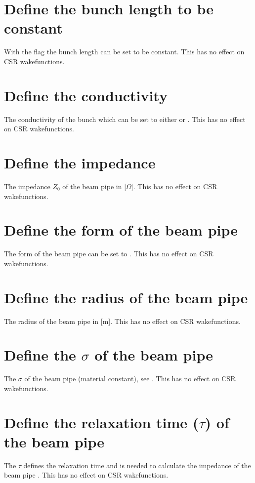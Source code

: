\section{Define the bunch length to be constant}
\label{sec:CONSTLEN}
With the  flag the bunch length can be set to be constant. This has no effect on CSR wakefunctions.

\section{Define the conductivity}
\label{sec:CONDUCT}
The conductivity of the bunch which can be set to either  or . This has no effect on CSR wakefunctions.

\section{Define the impedance}
\label{sec:Z}
The impedance $Z_0$ of the beam pipe in [$\Omega$]. This has no effect on CSR wakefunctions.

\section{Define the form of the beam pipe}
\label{sec:FORM}
The form of the beam pipe can be set to . This has no effect on CSR wakefunctions.

\section{Define the radius of the beam pipe}
\label{sec:RADIUS}
The radius of the beam pipe in [m]. This has no effect on CSR wakefunctions.

\section{Define the \texorpdfstring{$\sigma$}{sigma} of the beam pipe}
\label{sec:SIGMA}
The $\sigma$ of the beam pipe (material constant), see . This has no effect on CSR wakefunctions.

\section{Define the relaxation time (\texorpdfstring{$\tau$}{tau}) of the beam pipe}
\label{sec:TAU}
The $\tau$ defines the relaxation time and is needed to calculate the impedance of the beam pipe . This has no effect on CSR wakefunctions.

